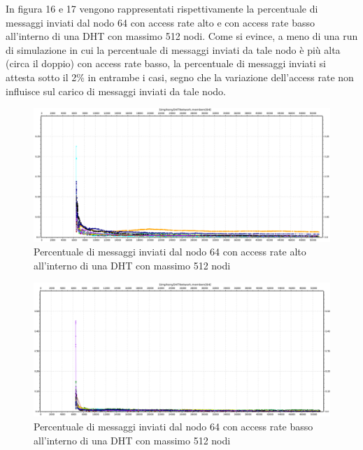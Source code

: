 \documentclass[	
	DIV=calc,
	paper=a4,
	fontsize=11pt,
	onecolumn
]{scrartcl} %
\begin{document}
	In figura 16 e 17 vengono rappresentati rispettivamente la percentuale di messaggi inviati dal nodo 64 con access rate alto e con access rate basso all'interno di una DHT con massimo 512 nodi. Come si evince, a meno di una run di simulazione in cui la percentuale di messaggi inviati da tale nodo è più alta (circa il doppio) con access rate basso, la percentuale di messaggi inviati si attesta sotto il 2\% in entrambe i casi, segno che la variazione dell'access rate non influisce sul carico di messaggi inviati da tale nodo.
	
	\begin{figure}[H]
		\centering
		\includegraphics[scale=0.35]	{SymphonyDHT/plots/PercentageOfMessagesSent/512_Nodes_FastAccess/SymphonyDHT_512Nodes_FastAccess_Node64.png}
		\caption{Percentuale di messaggi inviati dal nodo 64 con access rate alto all'interno di una DHT con massimo 512 nodi}
		\label{Figura 16}
	\end{figure}
	\begin{figure}[H]
		\centering
		\includegraphics[scale=0.35]	{SymphonyDHT/plots/PercentageOfMessagesSent/512_Nodes_SlowAccess/SymphonyDHT_512Nodes_SlowAccess_Node64.png}
		\caption{Percentuale di messaggi inviati dal nodo 64 con access rate basso all'interno di una DHT con massimo 512 nodi}
		\label{Figura 17}
	\end{figure}		
	
\end{document}
